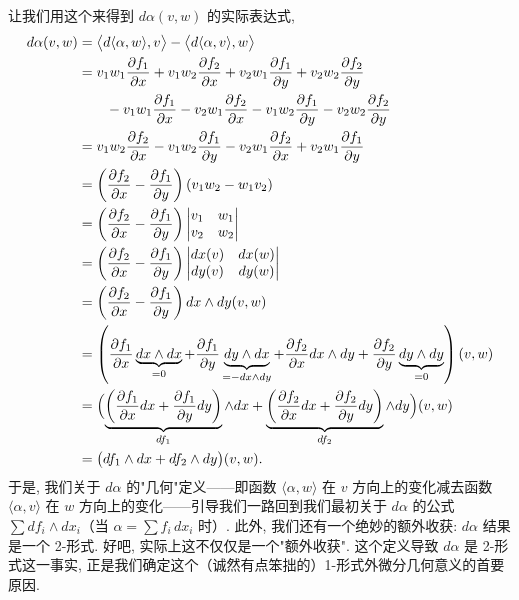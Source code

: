 让我们用这个来得到 $d\alpha(v,w)$ 的实际表达式, 
\begin{align*}
d\alpha(v,w)&=\bigl\langle d\langle\alpha,w\rangle,v\bigr\rangle-\bigl\langle d\langle\alpha,v\rangle,w\bigr\rangle\\
&=v_1w_1\frac{\partial f_1}{\partial x}+v_1w_2\frac{\partial f_2}{\partial x}
+v_2w_1\frac{\partial f_1}{\partial y}+v_2w_2\frac{\partial f_2}{\partial y}\\
&\qquad-v_1w_1\frac{\partial f_1}{\partial x}-v_2w_1\frac{\partial f_2}{\partial x}
-v_1w_2\frac{\partial f_1}{\partial y}-v_2w_2\frac{\partial f_2}{\partial y}\\
&=v_1w_2\frac{\partial f_2}{\partial x}-v_1w_2\frac{\partial f_1}{\partial y}
-v_2w_1\frac{\partial f_2}{\partial x}+v_2w_1\frac{\partial f_1}{\partial y}\\
&=\left(\frac{\partial f_2}{\partial x}-\frac{\partial f_1}{\partial y}\right)(v_1w_2-w_1v_2)\\
&=\left(\frac{\partial f_2}{\partial x}-\frac{\partial f_1}{\partial y}\right)
\begin{vmatrix}v_1&w_1\\v_2&w_2\end{vmatrix}\\
&=\left(\frac{\partial f_2}{\partial x}-\frac{\partial f_1}{\partial y}\right)
\begin{vmatrix}dx(v)&dx(w)\\dy(v)&dy(w)\end{vmatrix}\\
&=\left(\frac{\partial f_2}{\partial x}-\frac{\partial f_1}{\partial y}\right)dx\wedge dy(v,w)\\
&=\left(\frac{\partial f_1}{\partial x}\underbrace{dx\wedge dx}_{=0}
+\frac{\partial f_1}{\partial y}\underbrace{dy\wedge dx}_{=-dx\wedge dy}
+\frac{\partial f_2}{\partial x}dx\wedge dy
+\frac{\partial f_2}{\partial y}\underbrace{dy\wedge dy}_{=0}\right)(v,w)\\
&=\Bigl(\underbrace{\left(\frac{\partial f_1}{\partial x}dx+\frac{\partial f_1}{\partial y}dy\right)}_{df_1}\wedge dx
+\underbrace{\left(\frac{\partial f_2}{\partial x}dx+\frac{\partial f_2}{\partial y}dy\right)}_{df_2}\wedge dy\Bigr)(v,w)\\
&=\bigl(df_1\wedge dx+df_2\wedge dy\bigr)(v,w).
\end{align*}
于是, 我们关于 $d\alpha$ 的"几何"定义——即函数 $\langle\alpha,w\rangle$ 在 $v$ 方向上的变化减去函数 $\langle\alpha,v\rangle$ 在 $w$ 方向上的变化——引导我们一路回到我们最初关于 $d\alpha$ 的公式 $\sum df_i\wedge dx_i$（当 $\alpha=\sum f_i\,dx_i$ 时）. 此外, 我们还有一个绝妙的额外收获: $d\alpha$ 结果是一个 2-形式. 好吧, 实际上这不仅仅是一个"额外收获". 这个定义导致 $d\alpha$ 是 2-形式这一事实, 正是我们确定这个（诚然有点笨拙的）1-形式外微分几何意义的首要原因.

